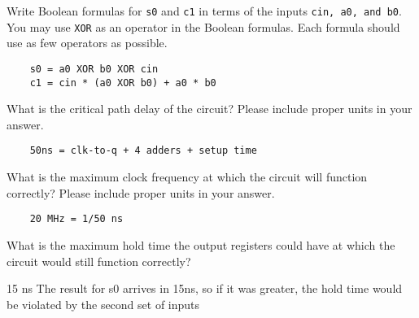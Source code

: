 \begin{blocksection}
\question
Write Boolean formulas for \lstinline$s0$ and \lstinline$c1$ in terms of the inputs \lstinline$cin, a0, and b0$. You may use \lstinline$XOR$ as an operator in the Boolean formulas. Each formula should use as few operators as possible.
\begin{solution}
    \begin{verbatim}
    s0 = a0 XOR b0 XOR cin
    c1 = cin * (a0 XOR b0) + a0 * b0
    \end{verbatim}
\end{solution}


\question
What is the critical path delay of the circuit? Please include proper units in your answer.
\begin{solution}
    \begin{verbatim}
    50ns = clk-to-q + 4 adders + setup time
    \end{verbatim}
\end{solution}


\question
What is the maximum clock frequency at which the circuit will function correctly? Please include proper units in your answer.
\begin{solution}
    \begin{verbatim}
    20 MHz = 1/50 ns
    \end{verbatim}
\end{solution}


\question
What is the maximum hold time the output registers could have at which the circuit would still function correctly?
\begin{solution}
15 ns
The result for s0 arrives in 15ns, so if it was greater, the hold time would be violated by the second set of inputs
\end{solution}

\end{blocksection}
